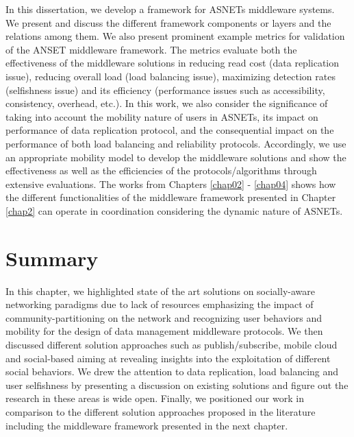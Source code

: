 In this dissertation, we develop a framework for ASNETs middleware systems. We present and discuss the different framework components or layers and the relations among them. We also present prominent example metrics for validation of the ANSET middleware framework. The metrics evaluate both the effectiveness of the middleware solutions in reducing read cost (data replication issue), reducing overall load (load balancing issue), maximizing detection rates (selfishness issue) and its efficiency (performance issues such as accessibility, consistency, overhead, etc.). In this work, we also consider the significance of taking into account the mobility nature of users in ASNETs, its impact on performance of data replication protocol, and the consequential impact on the performance of both load balancing and reliability protocols. Accordingly, we use an appropriate mobility model to develop the middleware solutions and show the effectiveness as well as the efficiencies of the protocols/algorithms through extensive evaluations. The works from Chapters \ref{chap02} - \ref{chap04} shows how the different functionalities of the middleware framework presented in Chapter \ref{chap2} can operate in coordination considering the dynamic nature of ASNETs.

\section{Summary}\label{Chap2_09}

In this chapter, we highlighted state of the art solutions on socially-aware networking paradigms due to lack of resources emphasizing the impact of community-partitioning on the network and recognizing user behaviors and mobility for the design of data management middleware protocols. We then discussed different solution approaches such as publish/subscribe, mobile cloud and social-based aiming at revealing insights into the exploitation of different social behaviors. We drew the attention to data replication, load balancing and user selfishness by presenting a discussion on existing solutions and figure out the research in these areas is wide open. Finally, we positioned our work in comparison to the different solution approaches proposed in the literature including the middleware framework presented in the next chapter.
